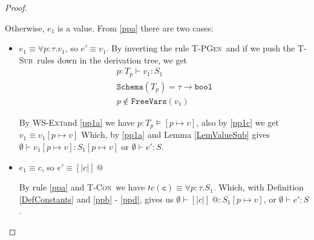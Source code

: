 \documentclass[10pt,a4paper]{article}
\makeatletter
\newcommand\tbbool{\ensuremath{\texttt{bool}}}
\newcommand\tc[1]{\ensuremath{tc\left(\texttt{#1}\right)}}
\newcommand\tpabs[3]{\ensuremath{\forall #1 : #2 . #3}}
\newcommand\epabs[3]{\ensuremath{\forall #1 : #2 . #3}}
\newcommand\epapp[1]{\ensuremath{{#1} \ @}}
\newcommand\tsub{\rulename{T-Sub}}
\newcommand\tcon{\rulename{T-Con}}
\newcommand\tpgen{\rulename{T-PGen}}
\newcommand\wsExt{\rulename{WS-Ext}}
\newcommand\isWellFormed[2]{\ensuremath{{#1}\models {#2}}}
\newcommand\hastype[3]{\ensuremath{{#1}\vdash {#2}:{#3}}}
\newcommand\hastypeEmp[2]{\hastype{\emptyset}{#1}{#2}}
\newcommand\rulename[1]{\textsc{#1}}
\newcommand\sch[1]{\ensuremath{\texttt{Schema}\left(#1\right)}}
\newcommand\fv[1]{\ensuremath{\texttt{FreeVars}\left(#1\right)}}
\newcommand\sub[2]{\ensuremath{\left[ #1 \mapsto #2 \right]}}
\makeatother
\begin{document}
\begin{proof}
\begin{itemize}
Otherwise, $e_1$ is a value. From \ref{ppa} there are two cases:

\begin{itemize}
\item $e_1 \equiv \epabs{p}{\tau}{v_{1}}$, so $e' \equiv v_1$.
By inverting the rule \tpgen\ and if we push the \tsub\ rules down in the derivation tree,
we get 
\begin{align}
	\hastype{p:T_p}{v_1}{S_1} \label{pp1a} \\
	\sch{T_p} = \tau \rightarrow \tbbool \label{pp1b}\\
	p \notin \fv{v_1} \label{pp1c}
\end{align}

By \wsExt and \ref{pp1a} we have \isWellFormed{p:T_p}{\sub{p}{v}},
also by \ref{pp1c} we get $v_1 \equiv v_1\sub{p}{v}$
Which, by \ref{pp1a} and Lemma \ref{LemValueSub} gives 
\hastypeEmp{v_1\sub{p}{v}}{S_1\sub{p}{v}} or
\hastypeEmp{e'}{S}.
 
\item $e_1 \equiv c$, 
so $e' \equiv \epapp{[|c|]}$
			
			By rule \ref{ppa} and \tcon \ we have 
			$\tc{c} \equiv \tpabs{p}{\tau}{S_1}$.
			Which, with Definition \ref{DefConstants} and \ref{ppb} - \ref{ppd}, gives us 
			\hastypeEmp{\epapp{[|c|]}}{{S_1\sub{p}{v}}}, or 
			\hastypeEmp{e'}{S}. 
\end{itemize}

\end{itemize}
\end{proof}
\end{document}
